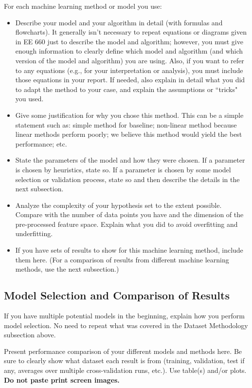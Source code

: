 \documentclass[singlecolumn]{article}
\begin{document}
For each machine learning method or model you use: 
\begin{itemize}
	\item Describe your model and your algorithm in detail (with formulas and flowcharts). It generally isn't necessary to repeat equations or diagrams given in EE 660 just to describe the model and algorithm; however, you must give enough information to clearly define which model and algorithm (and which version of the model and algorithm) you are using.  Also, if you want to refer to any equations (e.g., for your interpretation or analysis), you must include those equations in your report.  If needed, also explain in detail what you did to adapt the method to your case, and explain the assumptions or ``tricks" you used.
	\item Give some justification for why you chose this method. This can be a simple statement such as: simple method for baseline; non-linear method because linear methods perform poorly; we believe this method would yield the best performance; etc. 
	\item State the parameters of the model and how they were chosen. If a parameter is chosen by heuristics, state so. If a parameter is chosen by some model selection or validation process, state so and then describe the details in the next subsection.
	\item Analyze the complexity of your hypothesis set to the extent possible. Compare with the number of data points you have and the dimension of the pre-processed feature space. Explain what you did to avoid overfitting and underfitting. 
	\item If you have sets of results to show for this machine learning method, include them here.  (For a comparison of results from different machine learning methods, use the next subsection.) 
\end{itemize}

\subsection{Model Selection and Comparison of Results}
If you have multiple potential models in the beginning, explain how you perform model selection.  No need to repeat what was covered in the Dataset Methodology subsection above. 

Present performance comparison of your different models and methods here.  Be sure to clearly show what dataset each result is from (training, validation, test if any, averages over multiple cross-validation runs, etc.).  Use table(s) and/or plots. \textbf{Do not paste print screen images.}
\end{document}
